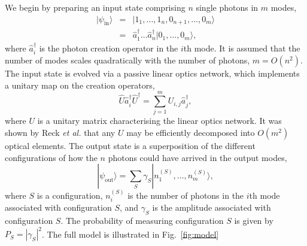 \documentclass[aps,pra,twocolumn,amsmath,amssymb,nofootinbib,superscriptaddress]{revtex4}
\newcommand{\ket}[1]{|#1\rangle}
\begin{document}
We begin by preparing an input state comprising $n$ single photons in $m$ modes,
\begin{eqnarray} \label{eq:input_state}
\ket{\psi_\mathrm{in}} &=& \ket{1_1,\dots,1_n,0_{n+1},\dots,0_m} \nonumber \\
&=& \hat{a}^\dag_1 \dots \hat{a}^\dag_n \ket{0_1,\dots,0_m},
\end{eqnarray}
where $\hat{a}^\dag_i$ is the photon creation operator in the $i$th mode. It is assumed that the number of modes scales quadratically with the number of photons, \mbox{$m=O(n^2)$}. The input state is evolved via a passive linear optics network, which implements a unitary map on the creation operators,
\begin{equation} \label{eq:Utransform}
\hat{U}\hat{a}_i^\dag\hat{U}^\dag = \sum_{j=1}^m U_{i,j} \hat{a}_j^\dag,
\end{equation} 
where $U$ is a unitary matrix characterising the linear optics network. It was shown by Reck \emph{et al.} \cite{bib:Reck94} that any $U$ may be efficiently decomposed into $O(m^2)$ optical elements. The output state is a superposition of the different configurations of how the $n$ photons could have arrived in the output modes,
\begin{equation}
\ket{\psi_\mathrm{out}} = \sum_S \gamma_S \ket{n_1^{(S)},\dots,n_m^{(S)}},
\end{equation}
where $S$ is a configuration, $n_i^{(S)}$ is the number of photons in the $i$th mode associated with configuration $S$, and $\gamma_S$ is the amplitude associated with configuration $S$. The probability of measuring configuration $S$ is given by \mbox{$P_S = |\gamma_S|^2$}. The full model is illustrated in Fig.~\ref{fig:model}
\end{document}
